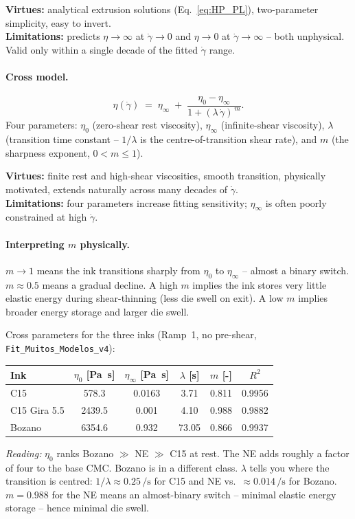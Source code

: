 \documentclass[11pt,a4paper]{article}
\newcommand{\gd}{\dot{\gamma}}
\begin{document}
\textbf{Virtues:} analytical extrusion solutions (Eq.~\ref{eq:HP_PL}),
two-parameter simplicity, easy to invert.\\
\textbf{Limitations:} predicts $\eta\to\infty$ at $\gd\to 0$ and
$\eta\to 0$ at $\gd\to\infty$ -- both unphysical. Valid only within a
single decade of the fitted $\gd$ range.

\paragraph{Cross model.}
\begin{equation}
\eta(\gd) \;=\; \eta_\infty
\;+\;\frac{\eta_0 - \eta_\infty}{1+(\lambda\,\gd)^{\,m}}.
\label{eq:cross}
\end{equation}
Four parameters: $\eta_0$ (zero-shear rest viscosity), $\eta_\infty$
(infinite-shear viscosity), $\lambda$ (transition time constant --
$1/\lambda$ is the centre-of-transition shear rate), and $m$ (the
sharpness exponent, $0<m\leq 1$).

\textbf{Virtues:} finite rest and high-shear viscosities, smooth
transition, physically motivated, extends naturally across many decades
of $\gd$.\\
\textbf{Limitations:} four parameters increase fitting sensitivity;
$\eta_\infty$ is often poorly constrained at high $\gd$.

\paragraph{Interpreting $m$ physically.}
$m\to 1$ means the ink transitions sharply from $\eta_0$ to $\eta_\infty$
-- almost a binary switch. $m\approx 0.5$ means a gradual decline.
A high $m$ implies the ink stores very little elastic energy during
shear-thinning (less die swell on exit). A low $m$ implies broader
energy storage and larger die swell.

\begin{examplebox}
Cross parameters for the three inks (Ramp~1, no pre-shear,
\texttt{Fit\_Muitos\_Modelos\_v4}):

\medskip\centering
\begin{tabular}{lccccc}
\toprule
Ink & $\eta_0$ [\si{\Pa\s}] & $\eta_\infty$ [\si{\Pa\s}] & $\lambda$ [\si{\s}] & $m$ [-] & $R^2$ \\
\midrule
C15           & 578.3   & 0.0163 & 3.71   & 0.811 & 0.9956 \\
C15 Gira 5.5  & 2439.5  & 0.001  & 4.10   & 0.988 & 0.9882 \\
Bozano        & 6354.6  & 0.932  & 73.05  & 0.866 & 0.9937 \\
\bottomrule
\end{tabular}

\medskip\flushleft
\emph{Reading:} $\eta_0$ ranks Bozano $\gg$ NE $\gg$ C15 at rest. The
NE adds roughly a factor of four to the base CMC. Bozano is in a
different class. $\lambda$ tells you where the transition is centred:
$1/\lambda\approx 0.25\,\si{\per\s}$ for C15 and NE vs.\ $\approx
0.014\,\si{\per\s}$ for Bozano. $m=0.988$ for the NE means an
almost-binary switch -- minimal elastic energy storage -- hence minimal
die swell.
\end{examplebox}
\end{document}
